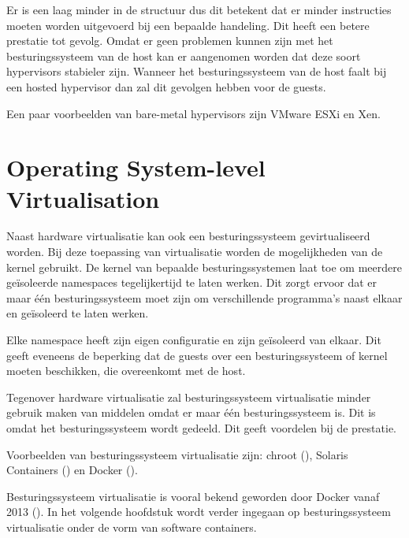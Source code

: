 Er is een laag minder in de structuur dus dit betekent dat er minder instructies moeten worden uitgevoerd bij een bepaalde handeling. Dit heeft een betere prestatie tot gevolg. Omdat er geen problemen kunnen zijn met het besturingssysteem van de host kan er aangenomen worden dat deze soort hypervisors stabieler zijn. Wanneer het besturingssysteem van de host faalt bij een hosted hypervisor dan zal dit gevolgen hebben voor de guests.

Een paar voorbeelden van bare-metal hypervisors zijn VMware ESXi en Xen.

\section{Operating System-level Virtualisation}

Naast hardware virtualisatie kan ook een besturingssysteem gevirtualiseerd worden. Bij deze toepassing van virtualisatie worden de mogelijkheden van de kernel gebruikt. De kernel van bepaalde besturingssystemen laat toe om meerdere geïsoleerde namespaces tegelijkertijd te laten werken. Dit zorgt ervoor dat er maar één besturingssysteem moet zijn om verschillende programma's naast elkaar en geïsoleerd te laten werken.

Elke namespace heeft zijn eigen configuratie en zijn geïsoleerd van elkaar. Dit geeft eveneens de beperking dat de guests over een besturingssysteem of kernel moeten beschikken, die overeenkomt met de host.

Tegenover hardware virtualisatie zal besturingssysteem virtualisatie minder gebruik maken van middelen omdat er maar één besturingssysteem is. Dit is omdat het besturingssysteem wordt gedeeld. Dit geeft voordelen bij de prestatie.

Voorbeelden van besturingssysteem virtualisatie zijn: chroot (\cite{linux_chroot2_????}), Solaris Containers (\cite{oracle_solaris_2016}) en Docker (\cite{docker_docker_2016}).

Besturingssysteem virtualisatie is vooral bekend geworden door Docker vanaf 2013 (\cite{hykes_future_2013}). In het volgende hoofdstuk wordt verder ingegaan op besturingssysteem virtualisatie onder de vorm van software containers.
